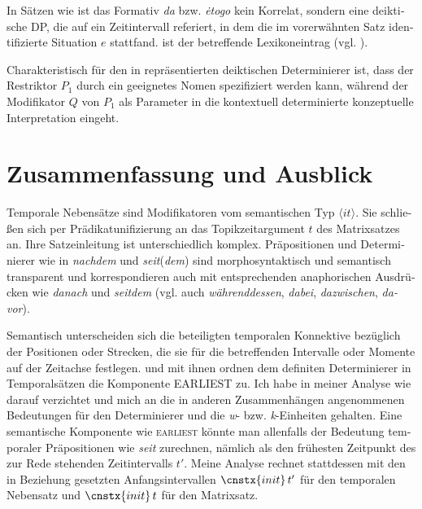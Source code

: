 \documentclass[output=paper, colorlinks, citecolor=brown, booklanguage=german]{langscibook}
\begin{document}
\begin{otherlanguage}{german}
\noindent In Sätzen wie  ist das Formativ \textit{da} bzw. \textit{ėtogo} kein Korrelat, sondern eine deiktische DP, die auf ein Zeitintervall referiert, in dem die im vorerwähnten Satz identifizierte Situation $e$ stattfand.  ist der betreffende Le\-xi\-kon\-eint\-rag
(vgl. ).

\ea \label{ex:18:46}
	\z
\z

\noindent Charakteristisch für den in  repräsentierten deiktischen Determinierer ist, dass der Restriktor $P_1$ durch ein geeignetes Nomen spezifiziert werden kann, während der Modifikator $Q$ von $P_1$ als Parameter in die kontextuell determinierte konzeptuelle Interpretation eingeht.

\section{Zusammenfassung und Ausblick} \label{sec:18:4}

\noindent Temporale Nebensätze sind Modifikatoren vom semantischen Typ $\langle it \rangle$. Sie schlie\-ßen sich per Prädikatunifizierung an das Topikzeitargument $t$ des Matrixsatzes an. Ihre Satzeinleitung ist unterschiedlich komplex. Präpositionen und Determinierer wie in \textit{nachdem} und \textit{seit}(\textit{dem}) sind morphosyntaktisch und semantisch transparent und korrespondieren auch mit entsprechenden anaphorischen Ausdrücken wie \textit{danach} und \textit{seitdem} (vgl. auch \textit{währenddessen}, \textit{dabei}, \textit{dazwischen}, \textit{davor}).

Semantisch unterscheiden sich die beteiligten temporalen Konnektive bezüg\-lich der Positionen oder Strecken, die sie für die betreffenden Intervalle oder Momente auf der Zeitachse festlegen. \citet{Beaver-Condoravdi2003} und mit ihnen \citet{Gronn-Stechow2010,Gronn-Stechow2012,Gronn-Stechow2013a} ordnen dem definiten Determinierer in Temporalsätzen die Komponente EARLIEST zu. Ich habe in meiner Analyse wie \citet{Krifka2010} darauf verzichtet und mich an die in anderen Zusammenhängen \citep{Zimmermann1993,Zimmermann1995,zi18:Zimmermann2000,Zimmermann2016} angenommenen Bedeutungen für den Determinierer und die \textit{w}- bzw. \textit{k}-Einheiten gehalten. Eine semantische Komponente wie \textsc{earliest} könnte man allenfalls der Bedeutung temporaler Präpositionen wie \textit{seit} zurechnen, nämlich als den frühesten Zeitpunkt des zur Rede stehenden Zeitintervalls $t'$. Meine Analyse rechnet stattdessen mit den in Beziehung gesetzten Anfangsintervallen $\cnstx{init}\, t'$ für den temporalen Nebensatz und $\cnstx{init}\, t$ für den Matrixsatz.


\end{otherlanguage}
\end{document}

